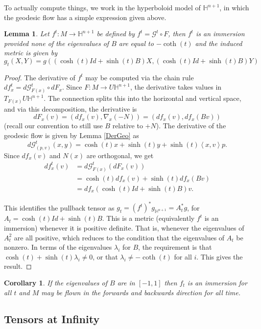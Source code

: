 \documentclass{amsart}
\newtheorem{lem}[thm]{Lemma}
\newtheorem{cor}[thm]{Corollary}
\renewcommand{\H}{\mathbb{H}}
\begin{document}
To actually compute things, we work in the hyperboloid model of $\H^{n+1}$,  in which the geodesic flow has a simple expression given above.

\begin{lem}
Let $f^t: M \to \H^{n+1}$ be defined by $f^t = \mathcal{G}^t \circ F$, then $f^t$ is an immersion provided none of the eigenvalues of $B$ are equal to $-\coth(t)$ and the induced metric is given by 
\[
g_t(X,Y) = g( (\cosh(t)Id + \sinh(t)B)X, (\cosh(t)Id + \sinh(t)B)Y)
\]
\end{lem}

\begin{proof}
The derivative of $f^t$ may be computed via the chain rule $df^t_x = d\mathcal{G}^t_{F(x)} \circ dF_x$.
Since $F: M \to U\H^{n+1}$, the derivative takes values in $T_{F(x)}U\H^{n+1}$.
The connection splits this into the horizontal and vertical space, and via this decomposition, the derivative is 
\[
dF_x(v) = (df_x(v),\nabla_x(-N)) = (df_x(v),df_x(Bv))
\]
(recall our convention to still use $B$ relative to $+N$).
The derivative of the geodesic flow is given by Lemma \ref{DerGeo} as
\[
d\mathcal{G}^t_{(p,v)}(x,y) = \cosh(t)x + \sinh(t)y + \sinh(t)\left< x,v \right> p.
\]
Since $df_x(v)$ and $N(x)$ are orthogonal, we get
\begin{align*}
df^t_x(v) &= d\mathcal{G}^t_{F(x)}(dF_x(v)) \\
&= \cosh(t)df_x(v) + \sinh(t)df_x(Bv) \\
&= df_x(\cosh(t)Id + \sinh(t)B)v.
\end{align*}


This identifies the pullback tensor as $g_t = (f^t)^*g_{\H^{n+1}} = A_t^*g$, for $A_t = \cosh(t)Id + \sinh(t)B$.
This is a metric (equivalently $f^t$ is an immersion) whenever it is positive definite.
That is, whenever the eigenvalues of $A_t^2$ are all positive, which reduces to the condition that the eigenvalues of $A_t$ be nonzero. 
In terms of the eigenvalues $\lambda_i$ for $B$, the requirement is that $\cosh(t) + \sinh(t)\lambda_i \neq 0$, or that $\lambda_i \neq -\coth(t)$ for all $i$. 
This gives the result.
\end{proof}

\begin{cor}
If the eigenvalues of $B$ are in $[-1,1]$ then $f_t$ is an immersion for all $t$ and $M$ may be flown in the forwards and backwards direction for all time. 
\end{cor}


\subsection{Tensors at Infinity}
\end{document}
